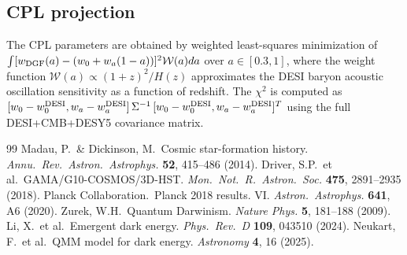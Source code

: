 \documentclass[12pt,a4paper]{article}
\begin{document}
\subsection{CPL projection}

The CPL parameters are obtained by weighted least-squares minimization of $\int[w_{\rm DGF}(a)-(w_0+w_a(1-a))]^2\mathcal{W}(a)da$ over $a\in[0.3,1]$, where the weight function $\mathcal{W}(a)\propto(1+z)^2/H(z)$ approximates the DESI baryon acoustic oscillation sensitivity as a function of redshift. The $\chi^2$ is computed as $[w_0-w_0^{\rm DESI},w_a-w_a^{\rm DESI}]\,\Sigma^{-1}\,[w_0-w_0^{\rm DESI},w_a-w_a^{\rm DESI}]^T$ using the full DESI+CMB+DESY5 covariance matrix.

\begin{thebibliography}{99}
 Madau, P.\ \& Dickinson, M.\ Cosmic star-formation history. {\it Annu.\ Rev.\ Astron.\ Astrophys.} {\bf 52}, 415--486 (2014).
 Driver, S.P.\ et al.\ GAMA/G10-COSMOS/3D-HST. {\it Mon.\ Not.\ R.\ Astron.\ Soc.} {\bf 475}, 2891--2935 (2018).
 Planck Collaboration.\ Planck 2018 results. VI. {\it Astron.\ Astrophys.} {\bf 641}, A6 (2020).
 Zurek, W.H.\ Quantum Darwinism. {\it Nature Phys.} {\bf 5}, 181--188 (2009).
 Li, X.\ et al.\ Emergent dark energy. {\it Phys.\ Rev.\ D} {\bf 109}, 043510 (2024).
 Neukart, F.\ et al.\ QMM model for dark energy. {\it Astronomy} {\bf 4}, 16 (2025).
\end{thebibliography}
\end{document}
